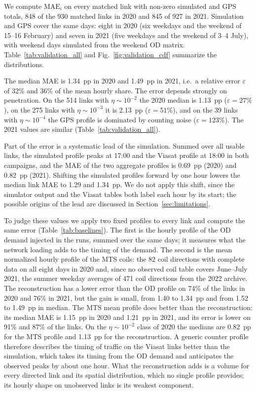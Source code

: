 \documentclass[pdflatex,Numbered]{sn-jnl}
\begin{document}
We compute $\mathrm{MAE}_i$ on every matched link with non-zero simulated and GPS totals, 848 of the 930 matched links in 2020 and 845 of 927 in 2021. Simulation and GPS cover the same days: eight in 2020 (six weekdays and the weekend of 15--16 February) and seven in 2021 (five weekdays and the weekend of 3--4 July), with weekend days simulated from the weekend OD matrix. Table~\ref{tab:validation_all} and Fig.~\ref{fig:validation_cdf} summarize the distributions.



The median MAE is 1.34~pp in 2020 and 1.49~pp in 2021, i.e.\ a relative error $\varepsilon$ of 32\% and 36\% of the mean hourly share. The error depends strongly on penetration. On the 514 links with $\eta\sim10^{-2}$ the 2020 median is 1.13~pp ($\varepsilon=27\%$), on the 275 links with $\eta\sim10^{-3}$ it is 2.13~pp ($\varepsilon=51\%$), and on the 39 links with $\eta\sim10^{-4}$ the GPS profile is dominated by counting noise ($\varepsilon=123\%$). The 2021 values are similar (Table~\ref{tab:validation_all}).

Part of the error is a systematic lead of the simulation. Summed over all usable links, the simulated profile peaks at 17:00 and the Viasat profile at 18:00 in both campaigns, and the MAE of the two aggregate profiles is 0.69~pp (2020) and 0.82~pp (2021). Shifting the simulated profiles forward by one hour lowers the median link MAE to 1.29 and 1.34~pp. We do not apply this shift, since the simulator output and the Viasat tables both label each hour by its start; the possible origins of the lead are discussed in Section~\ref{sec:limitations}.

To judge these values we apply two fixed profiles to every link and compute the same error (Table~\ref{tab:baselines}). The first is the hourly profile of the OD demand injected in the runs, summed over the same days; it measures what the network loading adds to the timing of the demand. The second is the mean normalized hourly profile of the MTS coils: the 82 coil directions with complete data on all eight days in 2020 and, since no observed coil table covers June--July 2021, the summer weekday averages of 471 coil directions from the 2022 archive. The reconstruction has a lower error than the OD profile on 74\% of the links in 2020 and 76\% in 2021, but the gain is small, from 1.40 to 1.34~pp and from 1.52 to 1.49~pp in median. The MTS mean profile does better than the reconstruction: its median MAE is 1.15~pp in 2020 and 1.21~pp in 2021, and its error is lower on 91\% and 87\% of the links. On the $\eta\sim10^{-2}$ class of 2020 the medians are 0.82~pp for the MTS profile and 1.13~pp for the reconstruction. A generic counter profile therefore describes the timing of traffic on the Viasat links better than the simulation, which takes its timing from the OD demand and anticipates the observed peaks by about one hour. What the reconstruction adds is a volume for every directed link and its spatial distribution, which no single profile provides; its hourly shape on unobserved links is its weakest component.
\end{document}
